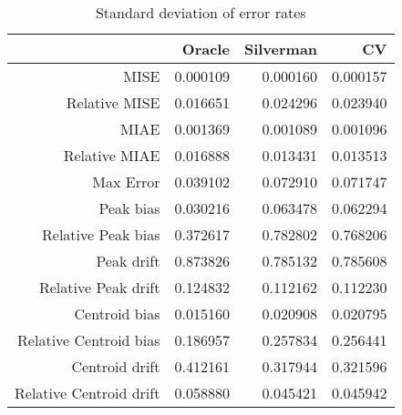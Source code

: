 \begin{table}[ht]
\centering
\begin{tabular}{rrrr}
  \hline
 & Oracle & Silverman & CV \\ 
  \hline
MISE & 0.000109 & 0.000160 & 0.000157 \\ 
  Relative MISE & 0.016651 & 0.024296 & 0.023940 \\ 
  MIAE & 0.001369 & 0.001089 & 0.001096 \\ 
  Relative MIAE & 0.016888 & 0.013431 & 0.013513 \\ 
  Max Error & 0.039102 & 0.072910 & 0.071747 \\ 
  Peak bias & 0.030216 & 0.063478 & 0.062294 \\ 
  Relative Peak bias & 0.372617 & 0.782802 & 0.768206 \\ 
  Peak drift & 0.873826 & 0.785132 & 0.785608 \\ 
  Relative Peak drift & 0.124832 & 0.112162 & 0.112230 \\ 
  Centroid bias & 0.015160 & 0.020908 & 0.020795 \\ 
  Relative Centroid bias & 0.186957 & 0.257834 & 0.256441 \\ 
  Centroid drift & 0.412161 & 0.317944 & 0.321596 \\ 
  Relative Centroid drift & 0.058880 & 0.045421 & 0.045942 \\ 
   \hline
\end{tabular}
\caption{Standard deviation of error rates} 
\label{tbl:stddev_error_rates}
\end{table}
